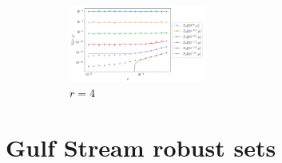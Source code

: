 \begin{figure}
\begin{center}
\begin{subfigure}{\textwidth}
			\includegraphics[width=0.49\textwidth]{chp04_paper_numerics/figures/multiplicative/str_err_rho_r_4.0_log.pdf}
			\caption{\(r = 4\)}
		\end{subfigure}
		\caption{}
		\label{fig:multiplicative_lines_extra}
	\end{center}
\end{figure}







\section{Gulf Stream robust sets}\label{app:s2_robust}



